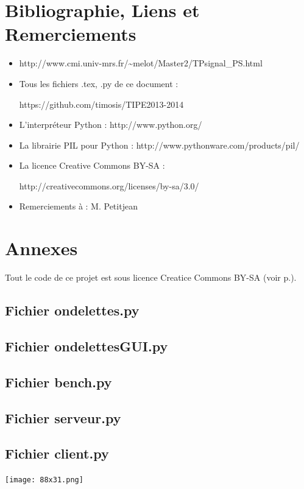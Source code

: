 \documentclass{article}
\begin{document}
\section{Bibliographie, Liens et Remerciements}
\label{links}
\begin{itemize}
\item http://www.cmi.univ-mrs.fr/\textasciitilde{}melot/Master2/TPsignal\_PS.html

\item Tous les fichiers .tex, .py de ce document :

https://github.com/timosis/TIPE2013-2014

\item L'interpréteur Python : http://www.python.org/

\item La librairie PIL pour Python : http://www.pythonware.com/products/pil/

\item La licence Creative Commons BY-SA :

http://creativecommons.org/licenses/by-sa/3.0/

\item Remerciements à : M. Petitjean
\end{itemize}


\clearpage
\lstset{language=Python,frame=single,breaklines=true,extendedchars=true, numbers=left,basicstyle=\footnotesize}
\section{Annexes}

Tout le code de ce projet est sous licence Creatice Commons BY-SA (voir p.\pageref{links}).


\subsection{Fichier ondelettes.py}


\subsection{Fichier ondelettesGUI.py}


\subsection{Fichier bench.py}


\subsection{Fichier serveur.py}


\subsection{Fichier client.py}


\begin{center}
\texttt{[image: 88x31.png]}

\end{center}
\end{document}
